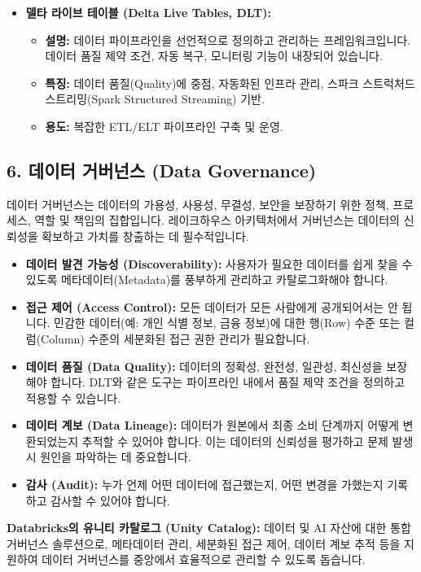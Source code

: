 \documentclass[11pt,a4paper]{article}
\begin{document}
\begin{tcolorbox}[title=\textbf{Databricks 데이터 수집 도구}, colback=lime!5!white, colframe=lime!75!black, sharp corners, boxrule=0.8pt]
\begin{itemize}
    \item \textbf{델타 라이브 테이블 (Delta Live Tables, DLT):}
    \begin{itemize}
        \item \textbf{설명:} 데이터 파이프라인을 선언적으로 정의하고 관리하는 프레임워크입니다. 데이터 품질 제약 조건, 자동 복구, 모니터링 기능이 내장되어 있습니다.
        \item \textbf{특징:} 데이터 품질(Quality)에 중점, 자동화된 인프라 관리, 스파크 스트럭처드 스트리밍(Spark Structured Streaming) 기반.
        \item \textbf{용도:} 복잡한 ETL/ELT 파이프라인 구축 및 운영.
    \end{itemize}
\end{itemize}
\end{tcolorbox}

\subsection*{6. 데이터 거버넌스 (Data Governance)}

데이터 거버넌스는 데이터의 가용성, 사용성, 무결성, 보안을 보장하기 위한 정책, 프로세스, 역할 및 책임의 집합입니다. 레이크하우스 아키텍처에서 거버넌스는 데이터의 신뢰성을 확보하고 가치를 창출하는 데 필수적입니다.

\begin{tcolorbox}[title=\textbf{데이터 거버넌스의 중요성}, colback=gray!5!white, colframe=gray!75!black, sharp corners, boxrule=0.8pt]
\begin{itemize}
    \item \textbf{데이터 발견 가능성 (Discoverability):} 사용자가 필요한 데이터를 쉽게 찾을 수 있도록 메타데이터(Metadata)를 풍부하게 관리하고 카탈로그화해야 합니다.
    \item \textbf{접근 제어 (Access Control):} 모든 데이터가 모든 사람에게 공개되어서는 안 됩니다. 민감한 데이터(예: 개인 식별 정보, 금융 정보)에 대한 행(Row) 수준 또는 컬럼(Column) 수준의 세분화된 접근 권한 관리가 필요합니다.
    \item \textbf{데이터 품질 (Data Quality):} 데이터의 정확성, 완전성, 일관성, 최신성을 보장해야 합니다. DLT와 같은 도구는 파이프라인 내에서 품질 제약 조건을 정의하고 적용할 수 있습니다.
    \item \textbf{데이터 계보 (Data Lineage):} 데이터가 원본에서 최종 소비 단계까지 어떻게 변환되었는지 추적할 수 있어야 합니다. 이는 데이터의 신뢰성을 평가하고 문제 발생 시 원인을 파악하는 데 중요합니다.
    \item \textbf{감사 (Audit):} 누가 언제 어떤 데이터에 접근했는지, 어떤 변경을 가했는지 기록하고 감사할 수 있어야 합니다.
\end{itemize}
\textbf{Databricks의 유니티 카탈로그 (Unity Catalog):} 데이터 및 AI 자산에 대한 통합 거버넌스 솔루션으로, 메타데이터 관리, 세분화된 접근 제어, 데이터 계보 추적 등을 지원하여 데이터 거버넌스를 중앙에서 효율적으로 관리할 수 있도록 돕습니다.
\end{tcolorbox}
\end{document}
